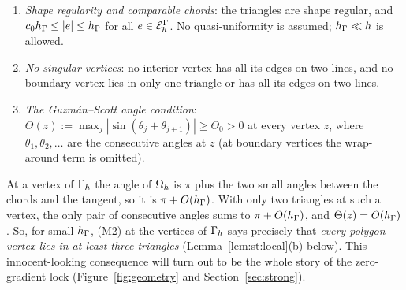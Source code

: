 \begin{assumption}[Mesh]\label{ass:mesh}\leavevmode
\begin{enumerate}[label=(M\arabic*),start=0]
\item \emph{Shape regularity and comparable chords}: the triangles are shape regular, and $c_0h_\Gamma\le|e|\le h_\Gamma$ for all $e\in\mathcal E_h^\Gamma$. No quasi-uniformity is assumed; $h_\Gamma\ll h$ is allowed.
\item \emph{No singular vertices}: no interior vertex has all its edges on two lines, and no boundary vertex lies in only one triangle or has all its edges on two lines.
\item \emph{The Guzm\'an--Scott angle condition}: $\Theta(z):=\max_j|\sin(\theta_j+\theta_{j+1})|\ge\Theta_0>0$ at every vertex $z$, where $\theta_1,\theta_2,\dots$ are the consecutive angles at $z$ \cite{GuzmanScott2019} (at boundary vertices the wrap-around term is omitted).
\end{enumerate}
\end{assumption}
At a vertex of $\Gamma_h$ the angle of $\Omega_h$ is $\pi$ plus the two small angles between the chords and the tangent, so it is $\pi+O(h_\Gamma)$. With only two triangles at such a vertex, the only pair of consecutive angles sums to $\pi+O(h_\Gamma)$, and $\Theta(z)=O(h_\Gamma)$. So, for small $h_\Gamma$, (M2) at the vertices of $\Gamma_h$ says precisely that \emph{every polygon vertex lies in at least three triangles} (Lemma~\ref{lem:st:local}(b) below). This innocent-looking consequence will turn out to be the whole story of the zero-gradient lock (Figure~\ref{fig:geometry} and Section~\ref{sec:strong}).

